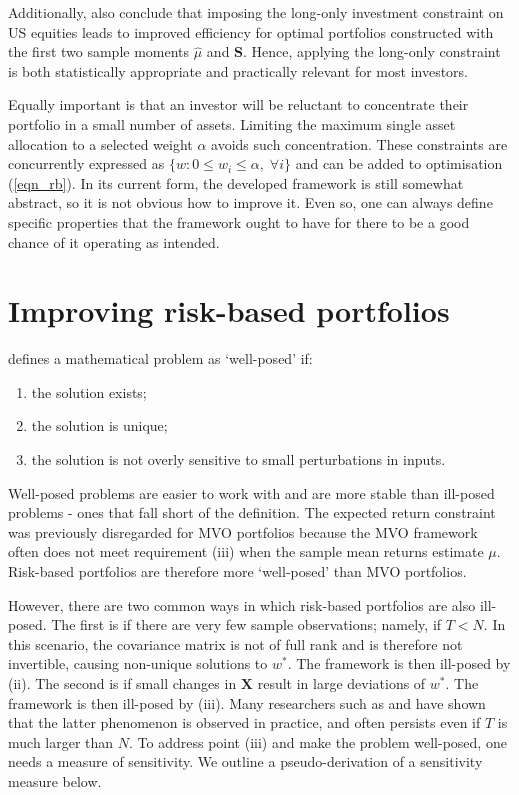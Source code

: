 \documentclass[a4paper,11pt,nocenter,bold,noupper,headcount]{mythesis}
\theoremstyle{plain}
\theoremstyle{definition}
\begin{document}
Additionally, \cite{JM03} also conclude that imposing the long-only investment constraint on US equities leads to improved efficiency for optimal portfolios constructed with the first two sample moments $\hat{\mu}$ and $\textbf{S}$. Hence, applying the long-only constraint is both statistically appropriate and practically relevant for most investors.

Equally important is that an investor will be reluctant to concentrate their portfolio in a small number of assets. Limiting the maximum single asset allocation to a selected weight $\alpha$ avoids such concentration. These constraints are concurrently expressed as $\{w :0 \leq w_i \leq \alpha, \; \forall i \}$ and can be added to optimisation (\ref{eqn_rb}). In its current form, the developed framework is still somewhat abstract, so it is not obvious how to improve it. Even so, one can always define specific properties that the framework ought to have for there to be a good chance of it operating as intended.

\section{Improving risk-based portfolios} \label{imp_rb}

\cite{H23} defines a mathematical problem as `well-posed' if:
\begin{enumerate} [label=(\roman*)]
\itemsep0em 
	\item the solution exists;
	\item the solution is unique;
	\item the solution is not overly sensitive to small perturbations in inputs.
\end{enumerate}
Well-posed problems are easier to work with and are more stable than ill-posed problems - ones that fall short of the definition. The expected return constraint was previously disregarded for MVO portfolios because the MVO framework often does not meet requirement (iii) when the sample mean returns estimate $\mu$. Risk-based portfolios are therefore more `well-posed' than MVO portfolios.

However, there are two common ways in which risk-based portfolios are also ill-posed. The first is if there are very few sample observations; namely, if $T < N$. In this scenario, the covariance matrix is not of full rank and is therefore not invertible, causing non-unique solutions to $w^*$. The framework is then ill-posed by (ii). The second is if small changes in $\textbf{X}$ result in large deviations of $w^*$. The framework is then ill-posed by (iii). Many researchers such as \cite{JK81} and \cite{B91} have shown that the latter phenomenon is observed in practice, and often persists even if $T$ is much larger than $N$.  To address point (iii) and make the problem well-posed, one needs a measure of sensitivity. We outline a pseudo-derivation of a sensitivity measure below.
\end{document}
